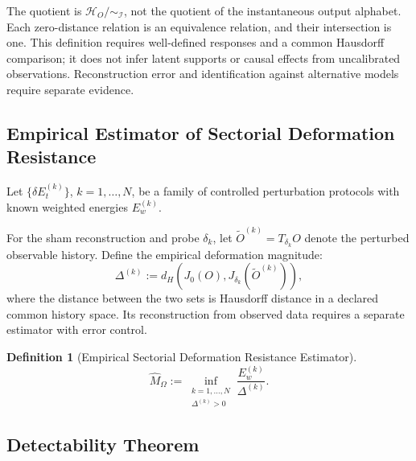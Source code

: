 \documentclass[11pt,a4paper]{article}
\theoremstyle{plain}
\theoremstyle{definition}
\newtheorem{definition}[theorem]{Definition}
\theoremstyle{remark}
\begin{document}
The quotient is $\mathcal H_O/{\sim_{\mathcal I}}$, not the quotient of the instantaneous output alphabet. Each zero-distance relation is an equivalence relation, and their intersection is one. This definition requires well-defined responses and a common Hausdorff comparison; it does not infer latent supports or causal effects from uncalibrated observations. Reconstruction error and identification against alternative models require separate evidence.

\subsection{Empirical Estimator of Sectorial Deformation Resistance}

Let $\{\delta E_t^{(k)}\}$, $k = 1, \ldots, N$, be a family of controlled perturbation protocols with known weighted energies $E_w^{(k)}$.

For the sham reconstruction and probe $\delta_k$, let $\tilde{O}^{(k)}=T_{\delta_k}O$ denote the perturbed observable history. Define the empirical deformation magnitude:
\begin{equation}
    \Delta^{(k)} := d_H(J_0(O),J_{\delta_k}(\tilde{O}^{(k)})),
\end{equation}
where the distance between the two sets is Hausdorff distance in a declared common history space. Its reconstruction from observed data requires a separate estimator with error control.

\begin{definition}[Empirical Sectorial Deformation Resistance Estimator]\label{def:emp-mass}
\begin{equation}
    \hat{M}_\Omega := \inf_{\substack{k = 1, \ldots, N \\ \Delta^{(k)} > 0}} \frac{E_w^{(k)}}{\Delta^{(k)}}.
\end{equation}
\end{definition}

\subsection{Detectability Theorem}
\end{document}
